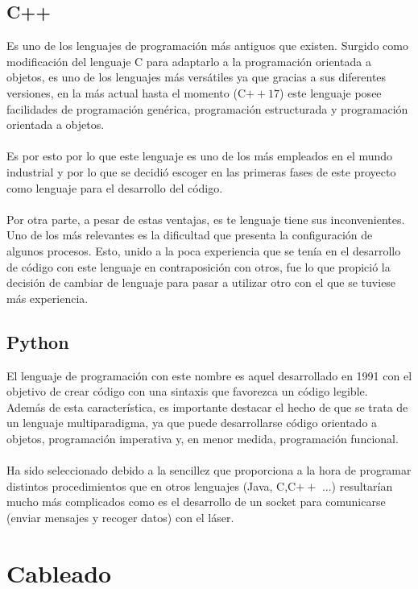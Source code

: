 \subsection{C++}
Es uno de los lenguajes de programación más antiguos que existen. Surgido como modificación del lenguaje C para adaptarlo a la programación orientada a objetos, es uno de los lenguajes más versátiles ya que gracias a sus diferentes versiones, en la más actual hasta el momento (C$++17$) este lenguaje posee facilidades de programación genérica,  programación estructurada y programación orientada a objetos.\cite{wikiCpp}\\
\\
Es por esto por lo que este lenguaje es uno de los más empleados en el mundo industrial y por lo que se decidió escoger en las primeras fases de este proyecto como lenguaje para el desarrollo del código.\\
\\
Por otra parte, a pesar de estas ventajas, es te lenguaje tiene sus inconvenientes. Uno de los más relevantes es la dificultad que presenta la configuración de algunos procesos. Esto, unido a la poca experiencia que se tenía en el desarrollo de código con este lenguaje en contraposición con otros, fue lo que propició la decisión de cambiar de lenguaje para pasar a utilizar otro con el que se tuviese más experiencia.


\subsection{Python}
El lenguaje de programación con este nombre es aquel desarrollado en 1991 con el objetivo de crear código con una sintaxis que favorezca un código legible.\\
Además de esta característica, es importante destacar el hecho de que se trata de un lenguaje multiparadigma, ya que puede desarrollarse código orientado a objetos, programación imperativa y, en menor medida, programación funcional.\cite{python} \\
\\
Ha sido seleccionado debido a la sencillez que proporciona a la hora de programar distintos procedimientos que en otros lenguajes (Java, C,C$++$ ...) resultarían mucho más complicados como es el desarrollo de un socket para comunicarse (enviar mensajes y recoger datos) con el láser.

\section{Cableado}

